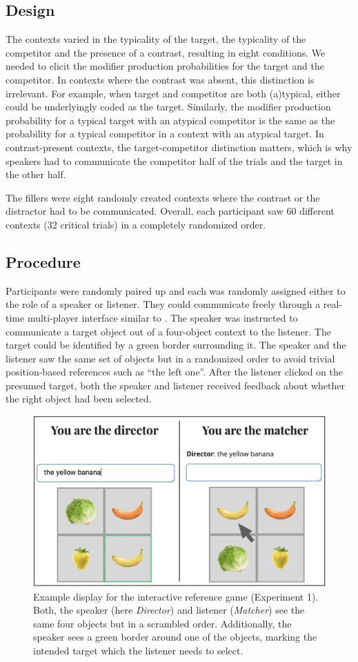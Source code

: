 \documentclass[10pt,letterpaper]{article}
\begin{document}
\subsection{Design}
The contexts varied in the typicality of the target, the typicality of the competitor and the presence of a contrast, resulting in eight conditions. 
We needed to elicit the modifier production probabilities for the target and the competitor. In contexts where the contrast was absent, this distinction is irrelevant. For example, when target and competitor are both (a)typical, either could be underlyingly coded as the target. Similarly, the modifier production probability for a typical target with an atypical competitor is the same as the probability for a typical competitor in a context with an atypical target. In contrast-present contexts, the target-competitor distinction matters, which is why speakers had to communicate the competitor half of the trials and the target in the other half.

The fillers were eight randomly created contexts where the contrast or the distractor had to be communicated.
Overall, each participant saw 60 different contexts (32 critical trials) in a completely randomized order.


\subsection{Procedure}
Participants were randomly paired up and each was randomly assigned either to the role of a speaker or listener. They could communicate freely through a real-time multi-player interface similar to \cite{Hawkins:2015}. The speaker was instructed to communicate a target object out of a four-object context to the listener. The target could be identified by a green border surrounding it. The speaker and the listener saw the same set of objects but in a randomized order to avoid trivial position-based references such as ``the left one''. After the listener clicked on the presumed target, both the speaker and listener received feedback about whether the right object had been selected.

\begin{figure}
	\begin{center}
		\includegraphics[width=.475\textwidth]{graphs/prod-design.pdf}
	\end{center}
\caption{Example display for the interactive reference game (Experiment 1). Both, the speaker (here \textit{Director}) and listener (\textit{Matcher}) see the same four objects but in a scrambled order. Additionally, the speaker sees a green border around one of the objects, marking the intended target which the listener needs to select.} 
\label{prod-design}
\end{figure}
\end{document}
